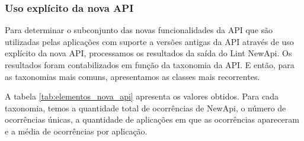 \subsubsection{Uso explícito da nova API}

Para determinar o subconjunto das novas funcionalidades da API que são utilizadas
pelas aplicações com suporte a versões antigas da API através de uso explícito da
nova API, processamos os resultados da saída do Lint NewApi. Os resultados foram contabilizados em função da taxonomia da API. E então, para as taxonomias mais
comuns, apresentamos as classes mais recorrentes.

A tabela \ref{tab:elementos_nova_api} apresenta os valores obtidos. Para cada
taxonomia, temos a quantidade total de ocorrências de NewApi, o número de
ocorrências únicas, a quantidade de aplicações em que as ocorrências apareceram
e a média de ocorrências por aplicação.

